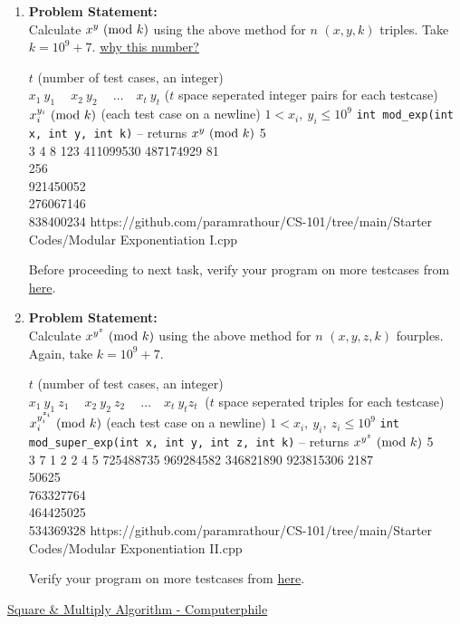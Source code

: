 \documentclass[../../Problems]{subfiles}
\begin{document}
\begin{enumerate}[label=(\alph*)]
\item 
\textbf{Problem Statement:}\\
Calculate $x^y\ (\mathrm{mod}\ k)$ using the above method for $n$ $(x,y,k)$ triples. Take $k=10^9+7$. \href{https://www.geeksforgeeks.org/modulo-1097-1000000007/}{why this number?}
\begin{testcasesFunction}
	{$t$ \hfill(number of test cases, an integer)\\
	$x_1\ y_1\ \quad x_2\ y_2\ \quad \ldots\quad x_t\ y_t$ \hfill($t$ space seperated integer pairs for each testcase)}
	{$x_i^{y_i} \ (\mathrm{mod}\ k)$ \hfill(each test case on a newline)}
	{$1 < x_i,\ y_i \leq 10^{9}$}
	{\texttt{int mod\_exp(int x, int y, int k)} -- returns $x^y \ (\mathrm{mod}\ k)$}
	{5\\3 4 8 123 411099530 487174929}
	{81\\256\\921450052\\276067146\\838400234}
	{https://github.com/paramrathour/CS-101/tree/main/Starter Codes/Modular Exponentiation I.cpp}
\end{testcasesFunction}
\begin{note}
	Before proceeding to next task, verify your program on more testcases from \href{https://cses.fi/problemset/task/1095}{here}.
\end{note}
\item 
\textbf{Problem Statement:}\\
Calculate $x^{y^z}\ (\mathrm{mod}\ k)$ using the above method for $n$ $(x,y,z,k)$ fourples. Again, take $k=10^9+7$.
\begin{testcasesFunction}
	{$t$ \hfill(number of test cases, an integer)\\
	$x_1\ y_1\ z_1\ \quad x_2\ y_2\ z_2\ \quad \ldots\quad x_t\ y_t z_t\ $ \hfill($t$ space seperated triples for each testcase)}
	{$x_i^{y_{i}^{z_i}} \ (\mathrm{mod}\ k)$ \hfill(each test case on a newline)}
	{$1 < x_i,\ y_i,\ z_i \leq 10^{9}$}
	{\texttt{int mod\_super\_exp(int x, int y, int z, int k)} -- returns $x^{y^z} \ (\mathrm{mod}\ k)$}
	{5\\3 7 1 2 2 4 5 725488735 969284582 346821890 923815306}
	{2187\\50625\\763327764\\464425025\\534369328}
	{https://github.com/paramrathour/CS-101/tree/main/Starter Codes/Modular Exponentiation II.cpp}
\end{testcasesFunction}
\begin{note}
	Verify your program on more testcases from \href{https://cses.fi/problemset/task/1712}{here}.
\end{note}
\end{enumerate}
\begin{funvideo}
\href{https://youtu.be/cbGB__V8MNk}{Square \& Multiply Algorithm - Computerphile}
\end{funvideo}
\recalctypearea
\end{document}
